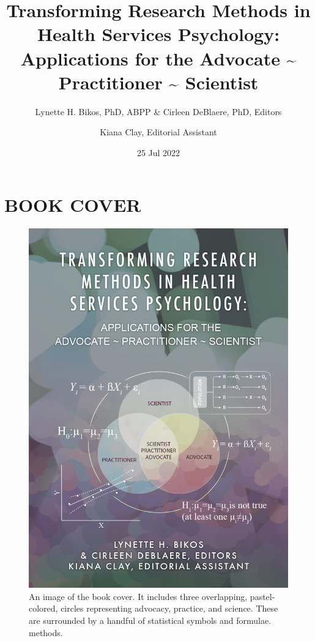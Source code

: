 \documentclass[
  11pt,
]{book}
\title{Transforming Research Methods in Health Services Psychology: Applications for the Advocate \textasciitilde{} Practitioner \textasciitilde{} Scientist}
\author{Lynette H. Bikos, PhD, ABPP \& Cirleen DeBlaere, PhD, Editors \and Kiana Clay, Editorial Assistant}
\date{25 Jul 2022}
\begin{document}
\maketitle

{
\hypersetup{linkcolor=}
\setcounter{tocdepth}{3}
\tableofcontents
}
\hypertarget{book-cover}{%
\chapter*{BOOK COVER}\label{book-cover}}

\begin{figure}
\centering
\includegraphics{images/bookcover.png}
\caption{An image of the book cover. It includes three overlapping, pastel-colored, circles representing advocacy, practice, and science. These are surrounded by a handful of statistical symbols and formulae. methods.}
\end{figure}
\end{document}
